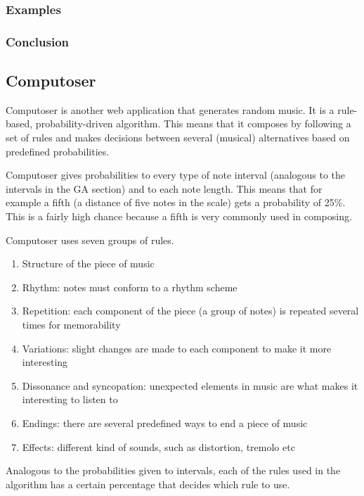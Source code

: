 \documentclass[12pt]{article}
\begin{document}
\newpage

\subsubsection{Examples}

\subsubsection{Conclusion}

\subsection{Computoser}

Computoser is another web application that generates random music. It is a rule-based, probability-driven algorithm. This means that it composes by following a set of rules and makes decisions between several (musical) alternatives based on predefined probabilities.
\newline

Computoser gives probabilities to every type of note interval (analogous to the intervals in the GA section) and to each note length.
This means that for example a fifth (a distance of five notes in the scale) gets a probability of 25\%. This is a fairly high chance because a fifth is very commonly used in composing.
\newline

Computoser uses seven groups of rules.
\begin{enumerate}
\item Structure of the piece of music 
\item Rhythm: notes must conform to a rhythm scheme
\item Repetition: each component of the piece (a group of notes) is repeated several times for memorability 
\item Variations: slight changes are made to each component to make it more interesting
\item Dissonance and syncopation: unexpected elements in music are what makes it interesting to listen to
\item Endings: there are several predefined ways to end a piece of music
\item Effects: different kind of sounds, such as distortion, tremolo etc
\end{enumerate}

Analogous to the probabilities given to intervals, each of the rules used in the algorithm has a certain percentage that decides which rule to use.
\newline
\end{document}
